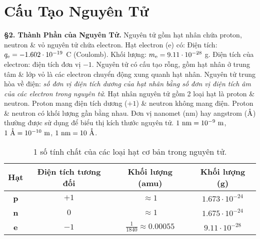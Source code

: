 \documentclass{article}
\numberwithin{equation}{section}
\begin{document}
\section{Cấu Tạo Nguyên Tử}
\textbf{\S2. Thành Phần của Nguyên Tử.} \textit{}Nguyên tử gồm hạt nhân chứa proton, neutron \& vỏ nguyên tử chứa electron. Hạt electron (e) có: Điện tích: $q_{\rm e} = -1.602\cdot 10^{-19}$ C (Coulomb). Khối lượng: $m_{\rm e} = 9.11\cdot 10^{-28}$ g. Điện tích của electron: điện tích đơn vị $-1$. Nguyên tử có cấu tạo rỗng, gồm hạt nhân ở trung tâm \& lớp vỏ là các electron chuyển động xung quanh hạt nhân. Nguyên tử trung hòa về điện: \textit{số đơn vị điện tích dương của hạt nhân bằng số đơn vị điện tích âm của các electron trong nguyên tử}. Hạt nhân nguyên tử gồm 2 loại hạt là proton \& neutron. Proton mang điện tích dương ($+1$) \& neutron không mang điện. Proton \& neutron có khối lượng gần bằng nhau. Đơn vị nanomet (nm) hay angstrom ($\mathring{\rm A}$) thường được sử dụng để biểu thị kích thước nguyên tử. $\rm 1\ nm = 10^{-9}\ m$, $\rm 1\ \mathring{\rm A} = 10^{-10}\ m$, $\rm 1\ nm = 10\ \mathring{\rm A}$.
\begin{table}[h]
	\centering
	\begin{tabular}{|c|c|c|c|}
		\hline
		\textbf{Hạt} & \textbf{Điện tích tương đối} & \textbf{Khối lượng (amu)} & \textbf{Khối lượng (g)} \\
		\hline
		\textbf{p} & $+1$ & $\approx 1$ & $1.673\cdot 10^{-24}$ \\
		\hline
		\textbf{n} & $0$ & $\approx 1$ & $1.675\cdot 10^{-24}$ \\
		\hline 
		\textbf{e} & $-1$ & $\frac{1}{1840}\approx 0.00055$ & $9.11\cdot 10^{-28}$ \\
		\hline
	\end{tabular}
	\caption{1 số tính chất của các loại hạt cơ bản trong nguyên tử.}
\end{table}
\end{document}
